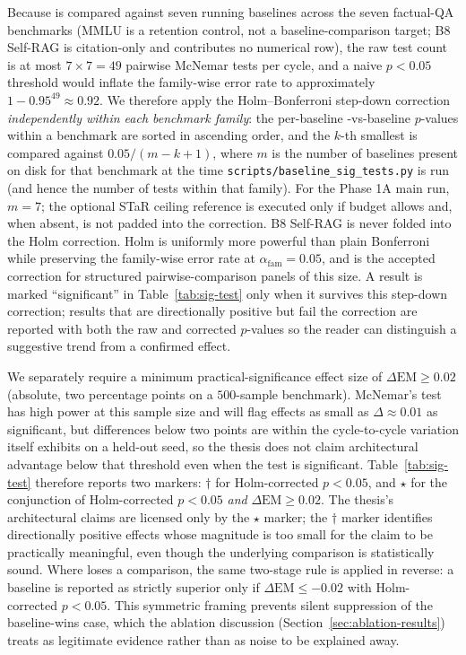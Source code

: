 Because \caem{} is compared against seven running baselines across the seven factual-QA benchmarks (MMLU is a retention control, not a baseline-comparison target; B8 Self-RAG is citation-only and contributes no numerical row), the raw test count is at most $7 \times 7 = 49$ pairwise McNemar tests per cycle, and a naive $p < 0.05$ threshold would inflate the family-wise error rate to approximately $1 - 0.95^{49} \approx 0.92$. We therefore apply the Holm--Bonferroni step-down correction~\cite{holm1979simple} \emph{independently within each benchmark family}: the per-baseline \caem{}-vs-baseline $p$-values within a benchmark are sorted in ascending order, and the $k$-th smallest is compared against $0.05 / (m - k + 1)$, where $m$ is the number of baselines present on disk for that benchmark at the time \texttt{scripts/baseline\_sig\_tests.py} is run (and hence the number of tests within that family). For the Phase 1A main run, $m = 7$; the optional STaR ceiling reference is executed only if budget allows and, when absent, is not padded into the correction. B8 Self-RAG is never folded into the Holm correction. Holm is uniformly more powerful than plain Bonferroni while preserving the family-wise error rate at $\alpha_{\text{fam}} = 0.05$, and is the accepted correction for structured pairwise-comparison panels of this size. A result is marked ``significant'' in Table~\ref{tab:sig-test} only when it survives this step-down correction; results that are directionally positive but fail the correction are reported with both the raw and corrected $p$-values so the reader can distinguish a suggestive trend from a confirmed effect.

We separately require a minimum practical-significance effect size of $\Delta\mathrm{EM} \geq 0.02$ (absolute, two percentage points on a $500$-sample benchmark). McNemar's test has high power at this sample size and will flag effects as small as $\Delta \approx 0.01$ as significant, but differences below two points are within the cycle-to-cycle variation \caem{} itself exhibits on a held-out seed, so the thesis does not claim architectural advantage below that threshold even when the test is significant. Table~\ref{tab:sig-test} therefore reports two markers: $\dagger$ for Holm-corrected $p < 0.05$, and $\star$ for the conjunction of Holm-corrected $p < 0.05$ \emph{and} $\Delta\mathrm{EM} \geq 0.02$. The thesis's architectural claims are licensed only by the $\star$ marker; the $\dagger$ marker identifies directionally positive effects whose magnitude is too small for the claim to be practically meaningful, even though the underlying comparison is statistically sound. Where \caem{} loses a comparison, the same two-stage rule is applied in reverse: a baseline is reported as strictly superior only if $\Delta\mathrm{EM} \leq -0.02$ with Holm-corrected $p < 0.05$. This symmetric framing prevents silent suppression of the baseline-wins case, which the ablation discussion (Section~\ref{sec:ablation-results}) treats as legitimate evidence rather than as noise to be explained away.

